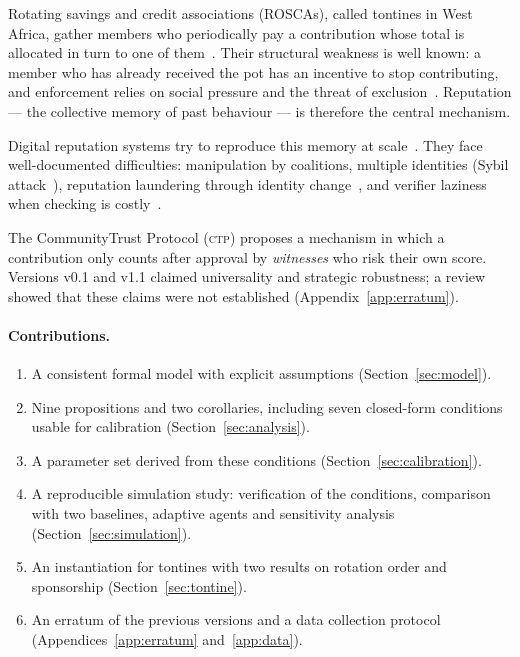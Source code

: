 \documentclass[11pt,a4paper]{article}
\theoremstyle{plain}
\theoremstyle{definition}
\theoremstyle{remark}
\newcommand{\CTP}{\textsc{ctp}}
\newcommand{\1}{\mathbf{1}}
\begin{document}
Rotating savings and credit associations (ROSCAs), called tontines in West
Africa, gather members who periodically pay a contribution whose total is
allocated in turn to one of them~\cite{ardener1964,besley1993,handa1999}. Their
structural weakness is well known: a member who has already received the pot
has an incentive to stop contributing, and enforcement relies on social
pressure and the threat of exclusion~\cite{anderson2009}. Reputation --- the
collective memory of past behaviour --- is therefore the central mechanism.

Digital reputation systems try to reproduce this memory at
scale~\cite{resnick2000,dellarocas2003,josang2007}. They face well-documented
difficulties: manipulation by coalitions, multiple identities (Sybil
attack~\cite{douceur2002}), reputation laundering through identity
change~\cite{friedman2001}, and verifier laziness when checking is
costly~\cite{luu2015}.

The CommunityTrust Protocol (\CTP{}) proposes a mechanism in which a
contribution only counts after approval by \emph{witnesses} who risk their own
score. Versions v0.1 and v1.1 claimed universality and strategic robustness; a
review showed that these claims were not established
(Appendix~\ref{app:erratum}).

\paragraph{Contributions.}
\begin{enumerate}
  \item A consistent formal model with explicit assumptions
    (Section~\ref{sec:model}).
  \item Nine propositions and two corollaries, including seven closed-form
    conditions usable for calibration (Section~\ref{sec:analysis}).
  \item A parameter set derived from these conditions
    (Section~\ref{sec:calibration}).
  \item A reproducible simulation study: verification of the conditions,
    comparison with two baselines, adaptive agents and sensitivity analysis
    (Section~\ref{sec:simulation}).
  \item An instantiation for tontines with two results on rotation order and
    sponsorship (Section~\ref{sec:tontine}).
  \item An erratum of the previous versions and a data collection protocol
    (Appendices~\ref{app:erratum} and~\ref{app:data}).
\end{enumerate}
\end{document}
